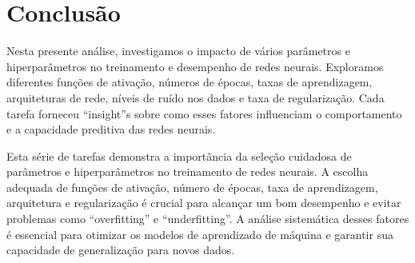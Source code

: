 \section{Conclusão}

Nesta presente análise, investigamos o impacto de vários parâmetros e 
hiperparâmetros no treinamento e desempenho de redes neurais. Exploramos 
diferentes funções de ativação, números de épocas, taxas de aprendizagem, 
arquiteturas de rede, níveis de ruído nos dados e taxa de regularização. Cada 
tarefa forneceu ``insight''s sobre como esses fatores influenciam o 
comportamento e a capacidade preditiva das redes neurais.

\begin{comment}
Na tarefa 1, descobrimos que a função de ativação Gelu nas camadas 
intermediárias resultou em uma melhor capacidade de aprendizado em comparação 
com a função sigmóide. A função Relu, embora interessante, apresentou um 
comportamento mais ruidoso, sugerindo a necessidade de uma inicialização de 
parâmetros e taxa de aprendizagem cuidadosas.

Na tarefa 2, observamos que um número excessivo de épocas de treinamento pode 
não trazer benefícios significativos após um certo ponto. As redes neurais 
convergiram para erros semelhantes após 5000 épocas, e a rede treinada com 
apenas 1000 épocas exibiu underfitting. Esta análise destaca a importância de 
monitorar o desempenho em diferentes pontos do treinamento.

A tarefa 3 enfatizou a escolha crucial da taxa de aprendizagem. Uma taxa muito 
baixa resultou em convergência lenta, enquanto uma taxa muito alta levou a um 
comportamento instável. A taxa de 0,05 pareceu ser um bom equilíbrio, 
proporcionando uma convergência suave e um bom desempenho final.

Na tarefa 4, descobrimos que a complexidade da arquitetura da rede deve ser 
considerada em relação à quantidade de dados. Uma rede neural mais simples pode 
convergir bem e fornecer resultados comparáveis a redes mais profundas, 
dependendo do problema.

A tarefa 5 revelou que níveis mais altos de ruído nos dados resultaram em uma 
convergência mais lenta e instável, mas o modelo adaptou-se e aprendeu a lidar 
com o ruído. Esta análise destaca a importância de considerar a qualidade dos 
dados e a necessidade de lidar com o ruído durante o treinamento.

Por fim, na tarefa 6, vimos que a regularização L2 pode ajudar a prevenir o 
overfitting, mas uma regularização muito forte pode levar a underfitting. O 
valor de λ=0.001 pareceu ser um bom equilíbrio, permitindo alguma regularização 
sem comprometer o desempenho.
\end{comment}

Esta série de tarefas demonstra a importância da seleção cuidadosa 
de parâmetros e hiperparâmetros no treinamento de redes neurais. A escolha 
adequada de funções de ativação, número de épocas, taxa de aprendizagem, 
arquitetura e regularização é crucial para alcançar um bom desempenho e evitar 
problemas como ``overfitting'' e ``underfitting''. A análise sistemática desses 
fatores é essencial para otimizar os modelos de aprendizado de máquina e 
garantir sua capacidade de generalização para novos dados.